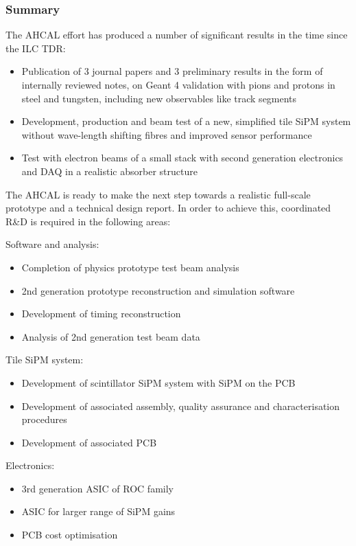 \subsubsection{Summary}
The AHCAL effort has produced a number of significant results in the time since the ILC TDR: 
\begin{itemize}
\item Publication of 3 journal papers and 3 preliminary results in the form of internally reviewed notes, on Geant 4 validation with pions and protons in steel and tungsten, including new observables like track segments
\item Development, production and beam test of a new, simplified tile SiPM system without wave-length shifting fibres and improved sensor performance
\item Test with electron beams of a small stack with second generation electronics and DAQ in a realistic absorber structure
\end{itemize}

The AHCAL is ready to make the next step towards a realistic full-scale prototype and a technical design report. In order to achieve this, coordinated R\&D is required in the following areas:

Software and analysis:
\begin{itemize}
\item Completion of physics prototype test beam analysis 
\item 2nd generation prototype reconstruction and simulation software
\item Development of timing reconstruction
\item Analysis of 2nd generation test beam data 
\end{itemize}

Tile SiPM system:
\begin{itemize}
\item Development of scintillator SiPM system with SiPM on the PCB
\item Development of associated assembly, quality assurance and characterisation procedures
\item Development of associated PCB
\end{itemize}

Electronics:
\begin{itemize}
\item 3rd generation ASIC of ROC family
\item ASIC for larger range of SiPM gains
\item PCB cost optimisation 
\end{itemize}

